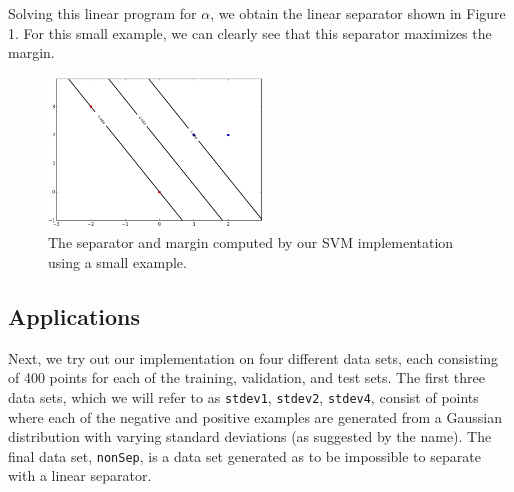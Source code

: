 \documentclass{sigchi}
\begin{document}
\large
Solving this linear program for $\alpha$, we obtain the linear separator shown in Figure 1. For this small example, we can clearly see that this separator maximizes the margin.

\begin{figure}
\centering
\includegraphics[width=2.25in]{plots/1-3/casey/simple.png}
\caption{The separator and margin computed by our SVM implementation using a small example.}
\end{figure}

\subsection{Applications}

Next, we try out our implementation on four different data sets, each consisting of 400 points for each of the training, validation, and test sets. The first three data sets, which we will refer to as \texttt{stdev1}, \texttt{stdev2}, \texttt{stdev4}, consist of points where each of the negative and positive examples are generated from a Gaussian distribution with varying standard deviations (as suggested by the name). The final data set, \texttt{nonSep}, is a data set generated as to be impossible to separate with a linear separator.
\end{document}
